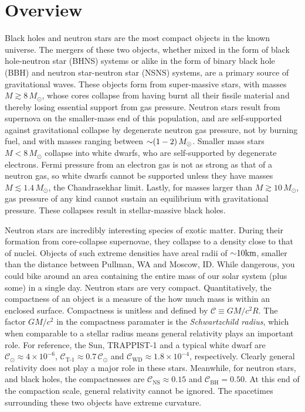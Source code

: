 \chapter{Overview}
\label{chap:chapter-1}


Black holes and neutron stars are the most compact objects in the known universe.  
The mergers of these two objects,
 whether mixed in the form of black hole-neutron star (BHNS) systems or alike in the form of binary black hole (BBH) and neutron star-neutron star (NSNS) systems,
 are a primary source of gravitational waves.  
These objects form from super-massive stars,
 with masses $M\gtrsim 8\,M_{\odot}$,
 whose cores collapse from having burnt all their fissile material and thereby
 losing essential support from gas pressure.
Neutron stars result from supernova on the smaller-mass end of this population,
 and are self-supported against gravitational collapse by degenerate neutron gas pressure,
 not by burning fuel,
 and with masses ranging between $\mathord{\sim} (1-2)\,M_{\odot}$.
Smaller mass stars $M < 8\, M_\odot$ collapse into white dwarfs,
 who are self-supported by degenerate electrons.  
Fermi pressure from an electron gas is not as strong as that of a neutron gas,
 so white dwarfs cannot be supported unless they have masses $M\lesssim 1.4\,M_{\odot}$,
 the Chandrasekhar limit.  
Lastly, for masses larger than $M\gtrsim 10\,M_{\odot}$,
 gas pressure of any kind cannot sustain an equilibrium with gravitational pressure.  
These collapses result in stellar-massive black holes.

Neutron stars are incredibly interesting species of exotic matter. 
During their formation from core-collapse supernovae,
 they collapse to a density close to that of nuclei.
Objects of such extreme densities have areal radii of $\mathord{\sim} 10 \textrm{km}$,
 smaller than the distance between Pullman, WA and Moscow, ID.
While dangerous, 
 you could bike around an area containing the entire mass of our solar system (plus some) in a single day.
Neutron stars are very compact.
Quantitatively, the compactness of an object is a measure of the how much mass is within an enclosed surface.
Compactness is unitless and defined by $\mathcal{C}\equiv G M/c^2 R$.
The factor $G M/c^2$ in the compactness paramater is the \textit{Schwartzchild radius},
 which when comparable to a stellar radius means general relativity plays an important role.
For reference,
 the Sun, TRAPPIST-1 and a typical white dwarf are
 $\mathcal{C}_{\odot} \approx 4 \times 10^{-6}$,
 $\mathcal{C}_\textrm{T-1} \approx 0.7\,\mathcal{C}_{\odot}$
 and
 $\mathcal{C}_\textrm{WD} \approx 1.8 \times 10^{-4}$,
 respectively.
Clearly general relativity does not play a major role in these stars.
Meanwhile, for neutron stars, and black holes, the compactnesses are 
 $\mathcal{C}_\textrm{NS} \approx 0.15$
 and
 $\mathcal{C}_\textrm{BH} = 0.50$.
At this end of the compaction scale, general relativity cannot be ignored.  The spacetimes surrounding these two objects have extreme curvature.

